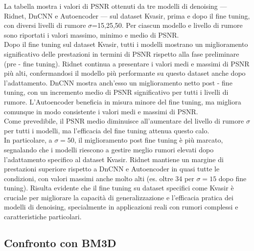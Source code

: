 \documentclass[12pt,a4paper,openright,twoside]{book}
\begin{document}
La tabella mostra i valori di PSNR  ottenuti da tre modelli di denoising — Ridnet, DnCNN e Autoencoder — sul dataset Kvasir, prima e dopo il fine tuning, con diversi livelli di rumore $\sigma$=15,25,50. Per ciascun modello e livello di rumore sono riportati i valori massimo, minimo e medio di PSNR.\\
Dopo il fine tuning sul dataset Kvasir, tutti i modelli mostrano un miglioramento significativo delle prestazioni in termini di PSNR rispetto alla fase preliminare (pre - fine tuning).
\whiteline
Ridnet continua a presentare i valori medi e massimi di PSNR più alti, confermandosi il modello più performante su questo dataset anche dopo l'adattamento.
\whiteline
DnCNN mostra anch'esso un miglioramento netto post - fine tuning, con un incremento medio di PSNR significativo per tutti i livelli di rumore.
\whiteline
L'Autoencoder beneficia in misura minore del fine tuning, ma migliora comunque in modo consistente i valori medi e massimi di PSNR.\\

Come prevedibile, il PSNR medio diminuisce all'aumentare del livello di rumore $\sigma$ per tutti i modelli, ma l'efficacia del fine tuning attenua questo calo.\\
In particolare, a $\sigma=50$, il miglioramento post fine tuning è più marcato, segnalando che i modelli riescono a gestire meglio rumori elevati dopo l'adattamento specifico al dataset Kvasir.
\whiteline
Ridnet mantiene un margine di prestazioni superiore rispetto a DnCNN e Autoencoder in quasi tutte le condizioni, con valori massimi anche molto alti (es. oltre 34 per $\sigma=15$ dopo fine tuning).
\whiteline
Risulta evidente che il fine tuning su dataset specifici come Kvasir è cruciale per migliorare la capacità di generalizzazione e l'efficacia pratica dei modelli di denoising, specialmente in applicazioni reali con rumori complessi e caratteristiche particolari.


\subsection*{Confronto con BM3D}
\end{document}
